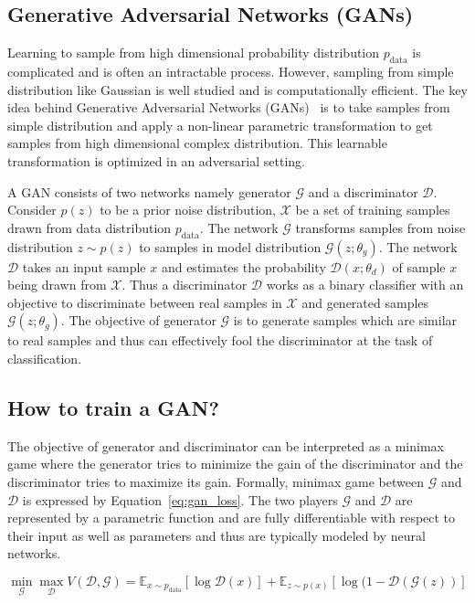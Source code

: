 \subsection{Generative Adversarial Networks (GANs)}
\label{subsec:gan}
Learning to sample from high dimensional probability distribution $p_\text{data}$ is complicated and is often an intractable process. However, sampling from simple distribution like Gaussian is well studied and is computationally efficient. 
The key idea behind Generative Adversarial Networks (GANs)~\cite{goodfellow2014generative} is to take samples from simple distribution and apply a non-linear parametric transformation to get samples from high dimensional complex distribution. This learnable transformation is optimized in an adversarial setting.

A GAN consists of two networks namely generator $\mathcal{G}$ and a discriminator $\mathcal{D}$. Consider $p(z)$ to be a prior noise distribution, $\mathcal{X}$ be a set of training samples drawn from data distribution $p_\text{data}$. The network $\mathcal{G}$ transforms samples from noise distribution $z\sim p(z)$ to samples in model distribution $\mathcal{G}(z;\theta_g)$. The network $\mathcal{D}$ takes an input sample $x$ and estimates the probability $\mathcal{D}(x;\theta_d)$ of sample $x$ being drawn from $\mathcal{X}$. Thus a discriminator $\mathcal{D}$ works as a binary classifier with an objective to discriminate between real samples in $\mathcal{X}$ and generated samples $\mathcal{G}(z;\theta_g)$. The objective of generator $\mathcal{G}$ is to generate samples which are similar to real samples and thus can effectively fool the discriminator at the task of classification. 

\subsection{How to train a GAN?}
\label{sub:train_gan}
The objective of generator and discriminator can be interpreted as a minimax game where the generator tries to minimize the gain of the discriminator and the discriminator tries to maximize its gain. Formally, minimax game between $\mathcal{G}$ and $\mathcal{D}$ is expressed by Equation~\ref{eq:gan_loss}. The two players $\mathcal{G}$ and $\mathcal{D}$ are represented by a parametric function and are fully differentiable with respect to their input as well as parameters and thus are typically modeled by neural networks.

\begin{equation}
    \label{eq:gan_loss}
    \min_{\mathcal{G}} \max_{\mathcal{D}} V(\mathcal{D}, \mathcal{G}) = \mathbb{E}_{x\sim p_\text{data}} [\log \mathcal{D}(x)] + \mathbb{E}_{z\sim p(x)} [\log (1 - \mathcal{D}(\mathcal{G}(z))]
\end{equation}

